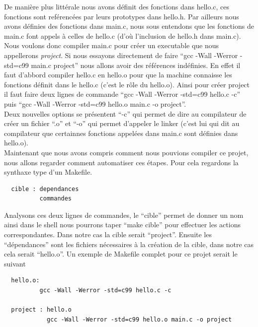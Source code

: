 \documentclass[a4paper,10pt]{article}
\begin{document}
\begin{spacing}{1.5}
\begin{center}
\end{center}
De manière plus littérale nous avons définit des fonctions dans hello.c, ces
fonctions sont reférencées par leurs prototypes dans hello.h. Par ailleurs nous
avons définies des fonctions dans main.c, nous sous entendons que les fonctions
de main.c font appels à celles de hello.c (d'où l'inclusion de hello.h dans
main.c). \\

Nous voulons donc compiler main.c pour créer un executable que nous appellerons
\textit{project}. Si nous essayons directement de faire ``gcc -Wall -Werror
-std=c99 main.c project'' nous allons avoir des références indéfinies. En effet
il faut d'abbord compiler hello.c en hello.o pour que la machine connaisse les
fonctions définit dans le hello.c (c'est le rôle du hello.o). Ainsi pour créer
project il faut faire deux lignes de commande ``gcc -Wall -Werror -std=c99
hello.c -c'' puis ``gcc -Wall -Werror -std=c99 hello.o main.c -o project''. \\

Deux nouvelles options se présentent ``-c'' qui permet de dire au compilateur de
créer un fichier ``.o'' et ``-o'' qui permet d'appeler le linker (c'est lui qui
dit au compilateur que certainnes fonctions appelées dans main.c sont définies
dans hello.o).\\

Maintenant que nous avons compris comment nous pouvions compiler ce projet, nous
allons regarder comment automatiser ces étapes. Pour cela regardons la synthaxe
type d'un Makefile.

\begin{lstlisting}
  cible : dependances
          commandes
\end{lstlisting}

Analysons ces deux lignes de commandes, le ``cible'' permet de donner un nom
ainsi dans le shell nous pourrons taper ``make cible'' pour effectuer les
actions correspondantes. Dans notre cas la cible serait ``project''. Ensuite les
``dépendances'' sont les fichiers nécessaires à la création de la cible, dans
notre cas cela serait ``hello.o''. Un exemple de Makefile complet pour ce projet
serait le suivant

\begin{lstlisting}
  hello.o:
          gcc -Wall -Werror -std=c99 hello.c -c

  project : hello.o
            gcc -Wall -Werror -std=c99 hello.o main.c -o project
\end{lstlisting}


\end{spacing}
\end{document}
